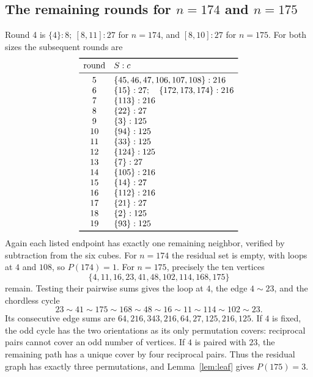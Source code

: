 \subsection{The remaining rounds for \texorpdfstring{$n=174$ and $n=175$}{n=174 and n=175}}\label{app:175}
Round 4 is $\{4\}:8;\ [8,11]:27$ for $n=174$, and
$[8,10]:27$ for $n=175$. For both sizes the subsequent rounds are
\[
\begin{array}{cl}\toprule
\text{round}&S:c\\\midrule
5 &\{45,46,47,106,107,108\}:216\\
6 &\{15\}:27;\quad\{172,173,174\}:216\\
7 &\{113\}:216\\
8 &\{22\}:27\\
9 &\{3\}:125\\
10&\{94\}:125\\
11&\{33\}:125\\
12&\{124\}:125\\
13&\{7\}:27\\
14&\{105\}:216\\
15&\{14\}:27\\
16&\{112\}:216\\
17&\{21\}:27\\
18&\{2\}:125\\
19&\{93\}:125\\\bottomrule
\end{array}
\]
Again each listed endpoint has exactly one remaining neighbor, verified
by subtraction from the six cubes. For $n=174$ the residual set is empty,
with loops at $4$ and $108$, so $P(174)=1$.
For $n=175$, precisely the ten vertices
\[
\{4,11,16,23,41,48,102,114,168,175\}
\]
remain. Testing their pairwise sums gives the loop at $4$, the edge
$4\sim23$, and the chordless cycle
\[
23\sim41\sim175\sim168\sim48\sim16\sim11\sim114\sim102\sim23.
\]
Its consecutive edge sums are $64,216,343,216,64,27,125,216,125$.
If $4$ is fixed, the odd cycle has the two orientations as its only
permutation covers: reciprocal pairs cannot cover an odd number of vertices.
If $4$ is paired with $23$, the remaining path has a unique cover by
four reciprocal pairs. Thus the residual graph has exactly three
permutations, and Lemma~\ref{lem:leaf} gives $P(175)=3$.
